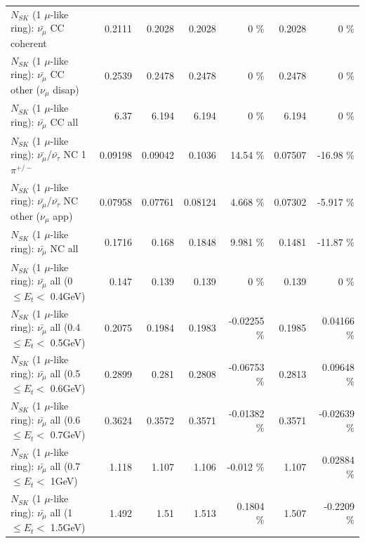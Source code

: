 \begin{table}
\begin{tabular}{| l | r | r | r  r | r  r |}
                       $N_{SK}$ (1 $\mu$-like ring): $\bar{\nu_\mu}$ CC coherent &          0.2111 &          0.2028 &          0.2028 &        0 \%  &          0.2028 &        0 \%  \\ 
        $N_{SK}$ (1 $\mu$-like ring): $\bar{\nu_\mu}$ CC other ($\nu_\mu$ disap) &          0.2539 &          0.2478 &          0.2478 &        0 \%  &          0.2478 &        0 \%  \\ 
                          $N_{SK}$ (1 $\mu$-like ring): $\bar{\nu_{\mu}}$ CC all &            6.37 &           6.194 &           6.194 &        0 \%  &           6.194 &        0 \%  \\ 
\hline
  $N_{SK}$ (1 $\mu$-like ring): $\bar{\nu_\mu}$/$\bar{\nu_\tau}$ NC 1$\pi^{+/-}$ &         0.09198 &         0.09042 &          0.1036 &    14.54 \%  &         0.07507 &   -16.98 \%  \\ 
$N_{SK}$ (1 $\mu$-like ring): $\bar{\nu_\mu}$/$\bar{\nu_\tau}$ NC other ($\nu_\mu$ app) &         0.07958 &         0.07761 &         0.08124 &    4.668 \%  &         0.07302 &   -5.917 \%  \\ 
                          $N_{SK}$ (1 $\mu$-like ring): $\bar{\nu_{\mu}}$ NC all &          0.1716 &           0.168 &          0.1848 &    9.981 \%  &          0.1481 &   -11.87 \%  \\ 
\hline
   $N_{SK}$ (1 $\mu$-like ring): $\bar{\nu_{\mu}}$ all (0 $\leq E_{t} <$ 0.4GeV) &           0.147 &           0.139 &           0.139 &        0 \%  &           0.139 &        0 \%  \\ 
 $N_{SK}$ (1 $\mu$-like ring): $\bar{\nu_{\mu}}$ all (0.4 $\leq E_{t} <$ 0.5GeV) &          0.2075 &          0.1984 &          0.1983 & -0.02255 \%  &          0.1985 &  0.04166 \%  \\ 
 $N_{SK}$ (1 $\mu$-like ring): $\bar{\nu_{\mu}}$ all (0.5 $\leq E_{t} <$ 0.6GeV) &          0.2899 &           0.281 &          0.2808 & -0.06753 \%  &          0.2813 &  0.09648 \%  \\ 
 $N_{SK}$ (1 $\mu$-like ring): $\bar{\nu_{\mu}}$ all (0.6 $\leq E_{t} <$ 0.7GeV) &          0.3624 &          0.3572 &          0.3571 & -0.01382 \%  &          0.3571 & -0.02639 \%  \\ 
   $N_{SK}$ (1 $\mu$-like ring): $\bar{\nu_{\mu}}$ all (0.7 $\leq E_{t} <$ 1GeV) &           1.118 &           1.107 &           1.106 &   -0.012 \%  &           1.107 &  0.02884 \%  \\ 
   $N_{SK}$ (1 $\mu$-like ring): $\bar{\nu_{\mu}}$ all (1 $\leq E_{t} <$ 1.5GeV) &           1.492 &            1.51 &           1.513 &   0.1804 \%  &           1.507 &  -0.2209 \%  \\ 

\end{tabular}
\end{table}

